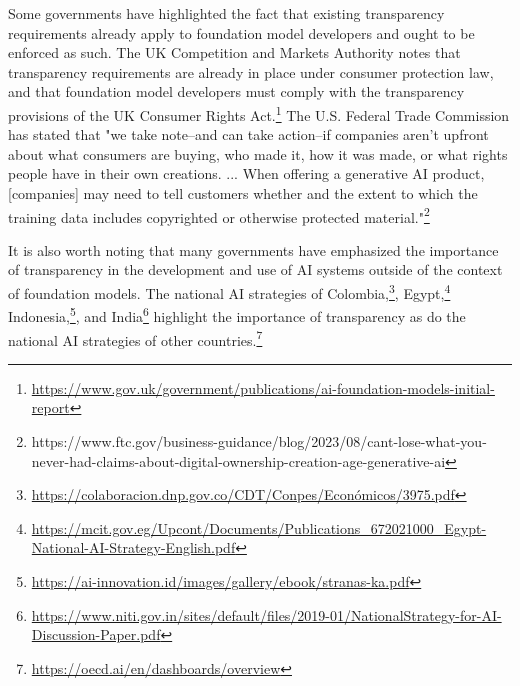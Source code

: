 Some governments have highlighted the fact that existing transparency requirements already apply to foundation model developers and ought to be enforced as such.
The UK Competition and Markets Authority notes that transparency requirements are already in place under consumer protection law, and that foundation model developers must comply with the transparency provisions of the UK Consumer Rights Act.\footnote{\url{https://www.gov.uk/government/publications/ai-foundation-models-initial-report}} The U.S. Federal Trade Commission has stated that "we take note–and can take action–if companies aren’t upfront about what consumers are buying, who made it, how it was made, or what rights people have in their own creations. ... When offering a generative AI product, [companies] may need to tell customers whether and the extent to which the training data includes copyrighted or otherwise protected material."\footnote{https://www.ftc.gov/business-guidance/blog/2023/08/cant-lose-what-you-never-had-claims-about-digital-ownership-creation-age-generative-ai}

It is also worth noting that many governments have emphasized the importance of transparency in the development and use of AI systems outside of the context of foundation models. The national AI strategies of Colombia,\footnote{\url{https://colaboracion.dnp.gov.co/CDT/Conpes/Económicos/3975.pdf}}, Egypt,\footnote{\url{https://mcit.gov.eg/Upcont/Documents/Publications_672021000_Egypt-National-AI-Strategy-English.pdf}} Indonesia,\footnote{\url{https://ai-innovation.id/images/gallery/ebook/stranas-ka.pdf}}, and India\footnote{\url{https://www.niti.gov.in/sites/default/files/2019-01/NationalStrategy-for-AI-Discussion-Paper.pdf}} highlight the importance of transparency as do the national AI strategies of other countries.\footnote{\url{https://oecd.ai/en/dashboards/overview}} 


